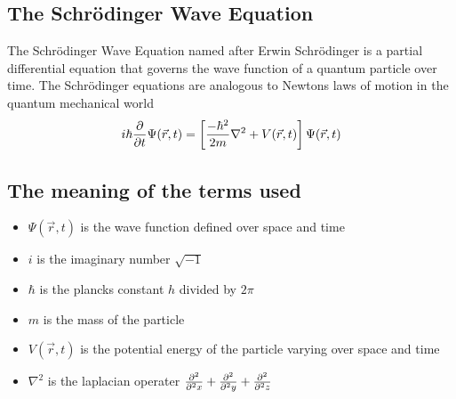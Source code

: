 \subsection{The Schr\"odinger Wave Equation}
{
The Schr\"odinger Wave Equation named after Erwin Schr\"odinger is a partial differential equation that governs the wave function of a quantum particle over time. The Schr\"odinger equations are analogous to Newtons laws of motion in the quantum mechanical world
    \begin{equation}
        i \hbar {\partial \over \partial t} \Psi (\vec{r},t) = \left[{-\hbar^2 \over 2m} \nabla^2 + V(\vec{r},t)\right] \Psi (\vec{r},t)
    \end{equation}
}

\subsection{The meaning of the terms used}
{
\begin{itemize}
\item $\Psi (\vec{r},t)$ is the wave function defined over space and time
\item $i$ is the imaginary number $\sqrt{-1}$
\item $\hbar$ is the plancks constant $h$ divided by $2\pi$
\item $m$ is the mass of the particle
\item $V(\vec{r},t)$ is the potential energy of the particle varying over space and time
\item $\nabla^2$ is the laplacian operater ${\partial^2 \over \partial^2 x} + {\partial^2 \over \partial^2 y} + {\partial^2 \over \partial^2 z}$
\end{itemize} 

    
}

